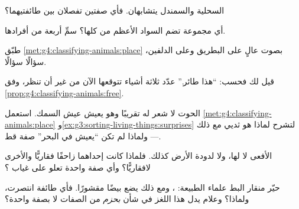 \begin{exercise}[$\star$]\label{exo:g4:classifying-animals:5}
السحلية والسمندل يتشابهان. فأي صفتين تفصلان بين طائفتيهما؟
\end{exercise}

\begin{exercise}[$\star$]\label{exo:g4:classifying-animals:6}
أي مجموعة تضم السواد الأعظم من  كلها؟ سمِّ أربعة من
أفرادها.
\end{exercise}

\begin{exercise}[$\star$]\label{exo:g4:classifying-animals:7}
طبّق \cref{met:g4:classifying-animals:place} بصوت عالٍ على
البطريق وعلى الدلفين، سؤالًا سؤالًا.
\end{exercise}

\begin{exercise}[$\star$]\label{exo:g4:classifying-animals:8}
قيل لك فحسب: ``هذا  طائر.'' عدّد ثلاثة أشياء تتوقعها الآن
من غير أن تنظر، وفق \cref{prop:g4:classifying-animals:free}.
\end{exercise}

\begin{exercise}[$\star\star$]\label{exo:g4:classifying-animals:9}
الحوت لا شعر له تقريبًا وهو يعيش عيش السمك. استعمل
\cref{met:g4:classifying-animals:place}
و\cref{ex:g3:sorting-living-things:surprises} لتشرح لماذا هو ثديي
مع ذلك --- ولماذا لم تكن ``يعيش في البحر'' صفة  قط.
\end{exercise}

\begin{exercise}[$\star\star$]\label{exo:g4:classifying-animals:10}
الأفعى لا  لها، ولا  لدودة الأرض كذلك. فلماذا كانت إحداهما
زاحفًا فقاريًّا والأخرى لافقاريًّا؟ وأي صفة واحدة تعلو على غياب
؟
\end{exercise}

\begin{exercise}[$\star\star\star$]\label{exo:g4:classifying-animals:11}
حيّر منقار البط علماء الطبيعة:  ، ومع ذلك يضع بيضًا
مقشورًا. فأي طائفة انتصرت، ولماذا؟ وعلام يدل هذا اللغز في شأن
 \emph{بحزم} من الصفات لا بصفة واحدة؟
\end{exercise}
